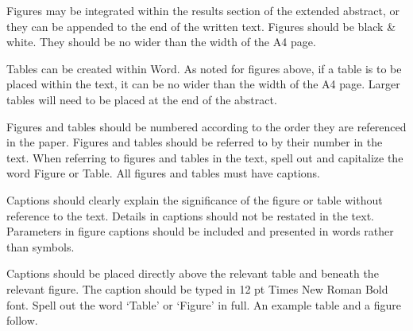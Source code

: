 
Figures may be integrated within the results section of the extended abstract, or they can be appended to the end of the written text. Figures should be black \& white. They should be no wider than the width of the A4 page.

Tables can be created within Word. As noted for figures above, if a table is to be placed within the text, it can be no wider than the width of the A4 page. Larger tables will need to be placed at the end of the abstract.

Figures and tables should be numbered according to the order they are referenced in the paper. Figures and tables should be referred to by their number in the text. When referring to figures and tables in the text, spell out and capitalize the word Figure or Table. All figures and tables must have captions.


Captions should clearly explain the significance of the figure or table without reference to the text. Details in captions should not be restated in the text. Parameters in figure captions should be included and presented in words rather than symbols.

Captions should be placed directly above the relevant table and beneath the relevant figure. The caption should be typed in 12 pt Times New Roman Bold font. Spell out the word `Table' or `Figure' in full. An example table and a figure follow.



